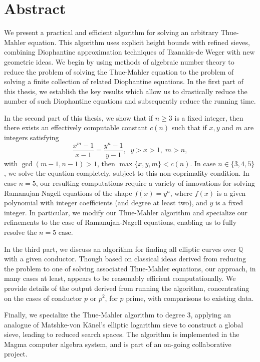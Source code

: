 
\chapter{Abstract}

We present a practical and efficient algorithm for solving an arbitrary Thue-Mahler equation. This algorithm uses explicit height bounds with refined sieves, combining Diophantine approximation techniques of Tzanakis-de Weger with new geometric ideas. We begin by using methods of algebraic number theory to reduce the problem of solving the Thue-Mahler equation to the problem of solving a finite collection of related Diophantine equations. In the first part of this thesis, we establish the key results which allow us to drastically reduce the number of such Diophantine equations and subsequently reduce the running time. 

In the second part of this thesis, we show that if $n \geq 3$ is a fixed integer, then there exists an effectively computable constant $c (n)$ such that if $x, y$ and $m$ are integers satisfying
$$
\frac{x^m-1}{x-1} = \frac{y^n-1}{y-1}, \; \; y>x>1, \; m > n,
$$
with $\gcd(m-1,n-1)>1$,
then $\max \{ x, y, m \} < c (n)$. In case $n \in \{ 3, 4, 5 \}$, we solve the equation completely, subject to this non-coprimality condition.  In case $n=5$, our resulting computations require a variety of innovations for solving Ramanujan-Nagell equations of the shape $f(x)=y^n$, where $f(x)$ is a given polynomial with integer coefficients (and degree at least two), and $y$ is a fixed integer. In particular, we modify our Thue-Mahler algorithm and specialize our refinements to the case of Ramanujan-Nagell equations, enabling us to fully resolve the $n = 5$ case. 

In the third part, we discuss an algorithm for finding all elliptic curves over $\mathbb{Q}$ with a given conductor. Though based on 
classical ideas derived from reducing the problem to one of solving associated Thue-Mahler equations,  our approach, in many cases at least, appears to be reasonably efficient  computationally. We provide 
details of the output derived from running the algorithm, concentrating on the cases of conductor $p$ or $p^2$, for $p$ prime, with comparisons to existing 
data. 

Finally, we specialize the Thue-Mahler algorithm to degree $3$, applying an analogue of Matshke-von K\"anel's elliptic logarithm sieve to construct a global sieve, leading to reduced search spaces. The algorithm is implemented in the Magma computer algebra system, and is part of an on-going collaborative project. 



